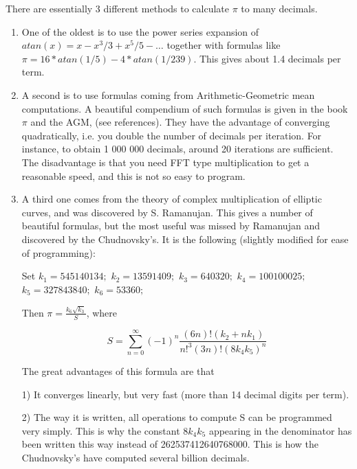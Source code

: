     There are essentially 3 different methods to calculate $\pi$
 to many decimals.

\begin{enumerate}

     \item One of the oldest is to use the power series expansion of
     $atan(x)=x-x^3/3+x^5/5-\ldots$ together with formulas like
     $\pi=16*atan(1/5)-4*atan(1/239)$. This gives about 1.4 decimals per term.

     \item A second is to use formulas coming from Arithmetic-Geometric mean
     computations. A beautiful compendium of such formulas is given in the
     book $\pi$ and the AGM, (see references).
      They have the advantage of converging
     quadratically, i.e. you double the number of decimals per iteration.
     For instance, to obtain 1 000 000 decimals, around 20 iterations are
     sufficient. The disadvantage is that you need FFT type multiplication
     to get a reasonable speed, and this is not so easy to program.

     \item
     A third one comes from the theory of complex multiplication of elliptic
     curves, and was discovered by S. Ramanujan. This gives a number of
     beautiful formulas, but the most useful was missed by Ramanujan and
     discovered by the Chudnovsky's. It is the following (slightly modified
     for ease of programming):

     Set $k_1=545140134;$ $k_2=13591409;$ $k_3=640320;$ $k_4=100100025;$
     $k_5=327843840;$ $k_6=53360;$

     Then $\pi=\frac{k_6\sqrt{k_3}}{S}$, where

     $$S=\sum_{n=0}^\infty (-1)^n\frac{(6n)!(k_2+nk_1)}{n!^3(3n)!(8k_4k_5)^n}$$

     The great advantages of this formula are that

     1) It converges linearly, but very fast (more than 14 decimal digits per
     term).

     2) The way it is written, all operations to compute S can be programmed
     very simply. This is why the constant $8k_4k_5$ appearing in the
     denominator has been written this way instead of 262537412640768000.
     This is how the Chudnovsky's have computed several billion decimals.

\end{enumerate}


